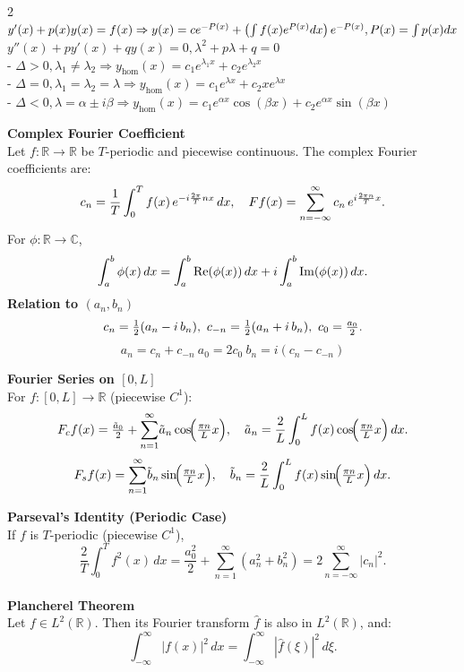 \documentclass[8pt]{article}
\begin{document}
\begin{multicols}{2}
	\hline\vspace*{2px}
	$y'(x) + p(x)y(x) = f(x) \Rightarrow y(x) = ce^{-P(x)} + \left(\int f(x)e^{P(x)} dx\right) e^{-P(x)}, \\
		P(x) = \int p(x) dx$
	\vspace{3px}\hline\vspace{3px}
	$y''(x) + py'(x) + qy(x) = 0, \lambda^2 + p\lambda + q = 0$\\
	- $\Delta > 0, \lambda_1 \neq \lambda_2 \Rightarrow y_{\text{hom}}(x) = c_1e^{\lambda_1 x} + c_2e^{\lambda_2 x}$\\
	- $\Delta = 0, \lambda_1 = \lambda_2 = \lambda \Rightarrow y_{\text{hom}}(x) = c_1e^{\lambda x} + c_2xe^{\lambda x}$\\
	- $\Delta < 0, \lambda = \alpha \pm i\beta \Rightarrow y_{\text{hom}}(x) = c_1e^{\alpha x} \cos(\beta x) + c_2e^{\alpha x} \sin(\beta x)$
	\columnbreak

	\noindent \textbf{Complex Fourier Coefficient}\\
	Let \( f : \mathbb{R} \to \mathbb{R} \) be \( T \)-periodic and piecewise continuous.  The complex Fourier coefficients are:
	\[
		c_n = \frac{1}{T} \int_0^T f(x)\, e^{-i \frac{2\pi}{T} n x} \, dx,
		\quad
		Ff(x) = \sum_{n=-\infty}^{\infty} c_{n}\,e^{i\frac{2\pi n}{T}x}.\vspace{-10px}
	\]
	For \( \phi : \mathbb{R} \to \mathbb{C} \), \vspace{-5px}
	\[ \int_a^b \phi(x)\,dx
		= \int_a^b \operatorname{Re}(\phi(x)) \, dx + i \int_a^b \operatorname{Im}(\phi(x)) \, dx. \vspace{-5px}
	\]
	\noindent \textbf{Relation to \( (a_n, b_n) \)}\quad
	\[ \vspace{-5px}
		c_{n} = \tfrac{1}{2}(a_{n} - i\,b_{n}),\
		c_{-n} = \tfrac{1}{2}(a_{n} + i\,b_{n}),\
		c_{0} = \tfrac{a_{0}}{2}.\]\[
		a_{n} = c_n + c_{-n}\
		a_{0} = 2 c_0 \
		b_n = i(c_n - c_{-n})
	\]

	\noindent \textbf{Fourier Series on $[0,L]$}\\
	For $f:[0,L]\to \mathbb{R}$ (piecewise $C^1$):
	\[
		F_{c}f(x)=\tfrac{\tilde a_{0}}{2} + \sum_{n=1}^{\infty}\!\tilde a_{n}\cos\!\Bigl(\tfrac{\pi n}{L}x\Bigr),
		\quad \tilde a_{n}=\frac{2}{L}\int_{0}^{L} f(x)\cos\!\Bigl(\tfrac{\pi n}{L}x\Bigr)\,dx.
	\]
	\[
		F_{s}f(x)=\sum_{n=1}^{\infty}\!\tilde b_{n}\sin\!\Bigl(\tfrac{\pi n}{L}x\Bigr),
		\quad \tilde b_{n}=\frac{2}{L}\int_{0}^{L} f(x)\sin\!\Bigl(\tfrac{\pi n}{L}x\Bigr)\,dx.
	\]

	\noindent \textbf{Parseval's Identity (Periodic Case)}\\
	If $f$ is $T$-periodic (piecewise $C^1$),
	\[
		\frac{2}{T}\int_{0}^{T} f^{2}(x)\,dx
		= \frac{a_{0}^{2}}{2} + \sum_{n=1}^{\infty}(a_{n}^{2}+b_{n}^{2})
		= 2\sum_{n=-\infty}^{\infty}\!\!\bigl|c_{n}\bigr|^{2}.
	\]\\[-10px]
	\noindent \textbf{Plancherel Theorem}\\
	Let $f \in L^2(\mathbb{R})$. Then its Fourier transform $\hat{f}$ is also in $L^2(\mathbb{R})$, and:
	\[
		\int_{-\infty}^\infty |f(x)|^2 \, dx
		= \int_{-\infty}^\infty |\hat{f}(\xi)|^2 \, d\xi.
	\]


\end{multicols}
\end{document}
